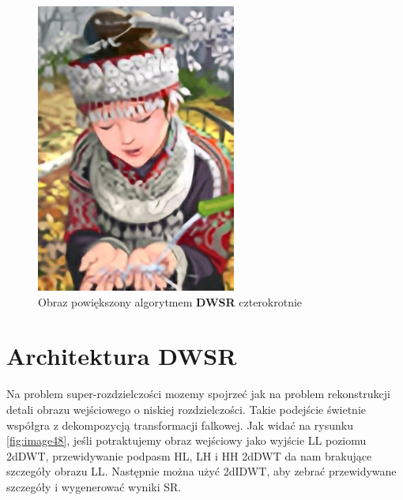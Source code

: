 \begin{figure}[ht]
\begin{minipage}[t]{0.4\linewidth}
        \includegraphics[width=\linewidth]{Rozdziały/02.Podstawy_teoretyczne/Obrazy/comic_DWSR_x4.png}
        \caption{Obraz powiększony algorytmem \textbf{DWSR} czterokrotnie}
        \label{fig:image47}
    \end{minipage}
\end{figure}



\section{Architektura DWSR}

Na problem super-rozdzielczości mozemy spojrzeć jak na problem rekonstrukcji detali obrazu wejściowego o niskiej rozdzielczości. Takie podejście świetnie współgra z dekompozycją transformacji falkowej. Jak widać na rysunku \ref{fig:image48}, jeśli potraktujemy obraz wejściowy jako wyjście LL poziomu 2dDWT, przewidywanie podpasm HL, LH i HH 2dDWT da nam brakujące szczegóły obrazu LL. Następnie można użyć 2dIDWT, aby zebrać przewidywane szczegóły i wygenerować wyniki SR.


